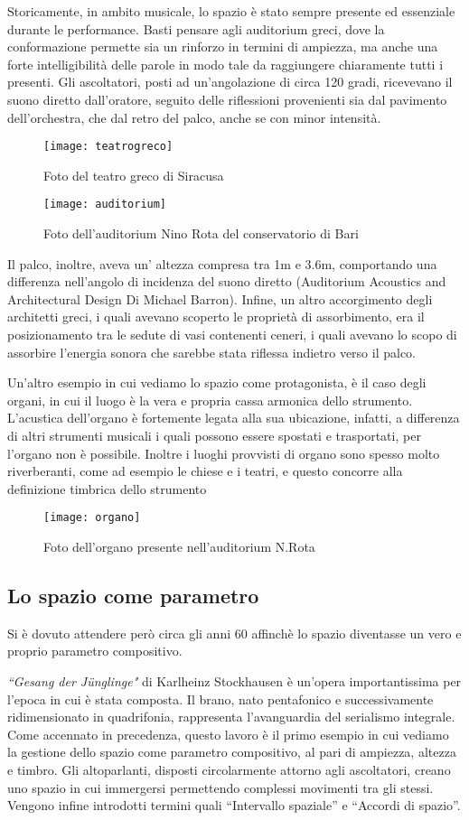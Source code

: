 Storicamente, in ambito musicale, lo spazio è stato sempre presente ed essenziale durante le performance. Basti pensare agli auditorium greci, dove la conformazione permette sia un rinforzo in termini di ampiezza, ma anche una forte intelligibilità delle parole in modo tale da raggiungere chiaramente tutti i presenti.
Gli ascoltatori, posti ad un'angolazione di circa 120 gradi, ricevevano il suono diretto dall’oratore, seguito delle riflessioni provenienti sia dal pavimento dell’orchestra, che dal retro del palco, anche se con minor intensità.

\begin{figure}[h]
\centering
\texttt{[image: teatrogreco]}
\caption{Foto del teatro greco di Siracusa}
\label{fig:teatrogreco}
\texttt{[image: auditorium]}
\caption{Foto dell'auditorium Nino Rota del conservatorio di Bari}
\label{fig:auditorium}
\end{figure}

Il palco, inoltre, aveva un’ altezza compresa tra 1m e 3.6m, comportando una differenza nell’angolo di incidenza del suono diretto (Auditorium Acoustics and Architectural Design Di Michael Barron).
Infine, un altro accorgimento degli architetti greci, i quali avevano scoperto le proprietà di assorbimento, era il posizionamento tra le sedute di vasi contenenti ceneri, i quali avevano lo scopo di assorbire l’energia sonora che sarebbe stata riflessa indietro verso il palco.

Un’altro esempio in cui vediamo lo spazio come protagonista, è il caso degli organi, in cui il luogo è la vera e propria cassa armonica dello strumento.
L’acustica dell’organo è fortemente legata alla sua ubicazione, infatti, a differenza di altri strumenti musicali i quali possono essere spostati e trasportati, per l’organo non è possibile. Inoltre i luoghi provvisti di organo sono spesso molto riverberanti, come ad esempio le chiese e i teatri, e questo concorre alla definizione timbrica dello strumento

\begin{figure}[h]
\centering
\texttt{[image: organo]}
\caption{Foto dell'organo presente nell'auditorium N.Rota}
\label{fig:organo}
\end{figure}

\subsection{Lo spazio come parametro}
Si è dovuto attendere però circa gli anni 60 affinchè lo spazio diventasse un vero e proprio parametro compositivo.

\emph{“Gesang der Jünglinge"} di Karlheinz Stockhausen è un’opera importantissima per l’epoca in cui è stata composta. Il brano, nato pentafonico e successivamente ridimensionato in quadrifonia, rappresenta l’avanguardia del serialismo integrale. Come accennato in precedenza, questo lavoro è il primo esempio in cui vediamo la gestione dello spazio come parametro compositivo, al pari di ampiezza, altezza e timbro.
Gli altoparlanti, disposti circolarmente attorno agli ascoltatori, creano uno spazio in cui immergersi permettendo complessi movimenti tra gli stessi.
Vengono infine introdotti termini quali “Intervallo spaziale” e “Accordi di spazio”.
